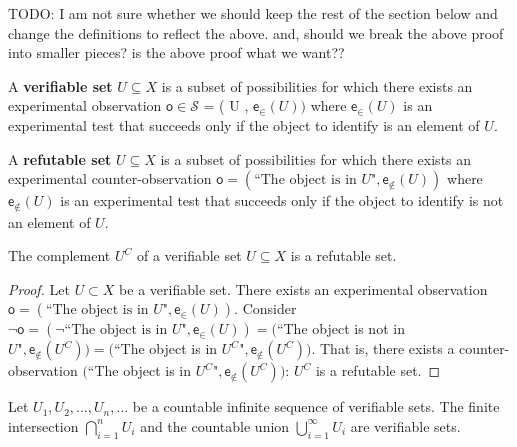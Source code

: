 \documentclass[11pt,letterpaper,fleqn]{memoir} %
\begin{document}
TODO: I am not sure whether we should keep the rest of the section below and change the definitions to reflect the above. and, should we break the above proof into smaller pieces? is the above proof what we want??



\begin{defn}
	A \textbf{verifiable set} $U \subseteq X$ is a subset of possibilities for which there exists an experimental observation $\mathsf{o}\in\mathcal{S}$  = ( U , $\mathsf{e}_\in(U))$ where $\mathsf{e}_\in(U)$ is an experimental test that succeeds only if the object to identify is an element of $U$.
\end{defn}

\begin{defn}
	A \textbf{refutable set} $U \subseteq X$ is a subset of possibilities for which there exists an experimental counter-observation $\mathsf{o} = (\text{``The object is in } U \text{"}, \mathsf{e}_{\notin}(U))$ where $\mathsf{e}_{\notin}(U)$ is an experimental test that succeeds only if the object to identify is not an element of $U$.
\end{defn}

\begin{prop}
	The complement $U^C$ of a verifiable set $U \subseteq X$ is a refutable set.
\end{prop}

\begin{proof}
	Let $U\subset X$ be a verifiable set. There exists an experimental observation $\mathsf{o} = (\text{``The object is in } U \text{"}, \mathsf{e}_\in(U))$. Consider $\neg \mathsf{o} = (\neg \text{``The object is in } U \text{"}, \mathsf{e}_\in(U)) = ($``The object  is not in $ U \text{"}, \mathsf{e}_{\notin}(U^C)) = ($``The object  is in $ U^C \text{"}, \mathsf{e}_{\notin}(U^C))$. That is, there exists a counter-observation $($``The object  is in $ U^C \text{"}, \mathsf{e}_{\notin}(U^C))$: $U^C$ is a refutable set.
\end{proof}

\begin{prop}
	Let $U_1, U_2, ... , U_n, ...$ be a countable infinite sequence of verifiable sets. The finite intersection $\bigcap\limits_{i=1}^{n} U_i$ and the countable union  $\bigcup\limits_{i=1}^{\infty} U_i$ are verifiable sets.
\end{prop}
\end{document}
